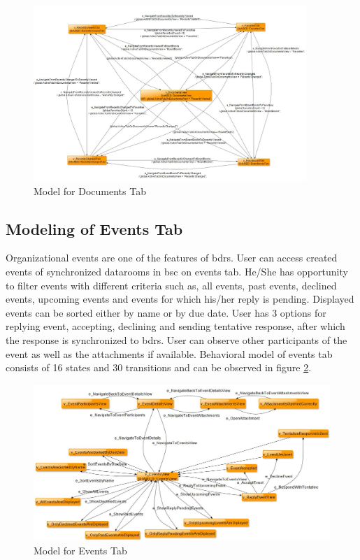 \begin{figure} [htbp!]
	\centering
					\includegraphics[width=0.92\textwidth]{figures/Documents_model_screenshot}
					\caption{\label{Fig:Documents_Model_Screenshot} Model for Documents Tab}
\end{figure}


\subsection{Modeling of Events Tab}
\par
Organizational events are one of the features of \acrshort{bdrs}. User can access created events of synchronized datarooms in \acrshort{bsc} on events tab. He/She has opportunity to filter events with different criteria such as, all events, past events, declined events, upcoming events and events for which his/her reply is pending. Displayed events can be sorted either by name or by due date. User has 3 options for replying event, accepting, declining and sending tentative response, after which the response is synchronized to \acrshort{bdrs}. User can observe other participants of the event as well as the attachments if available. Behavioral model of events tab consists of 16 states and 30 transitions and can be observed in figure \ref{Fig:Events_Model_Screenshot}.

\begin{figure} [htbp!]
	\centering
					\includegraphics[width=1\textwidth]{figures/Events_model_screenshot}
					\caption{\label{Fig:Events_Model_Screenshot} Model for Events Tab}
\end{figure}

